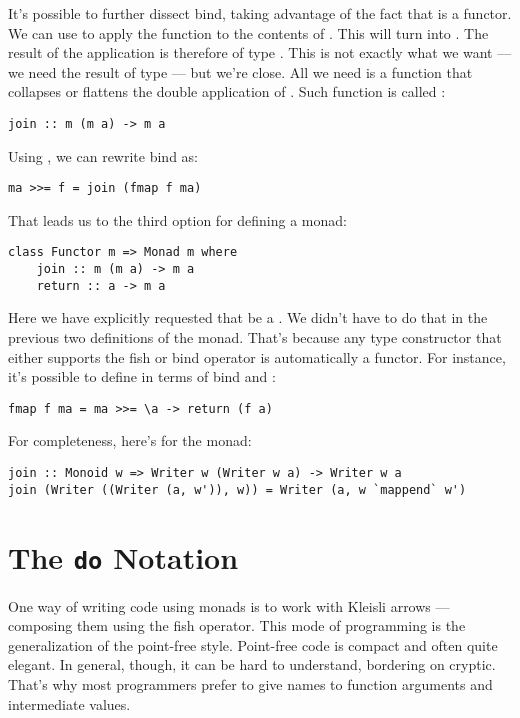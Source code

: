 It's possible to further dissect bind, taking advantage of the fact that
 is a functor. We can use  to apply the function
 to the contents of . This
will turn  into . The result of the application
is therefore of type . This is not exactly what we
want --- we need the result of type  --- but we're close.
All we need is a function that collapses or flattens the double
application of . Such function is called :

\begin{Verbatim}
join :: m (m a) -> m a
\end{Verbatim}
Using , we can rewrite bind as:

\begin{Verbatim}
ma >>= f = join (fmap f ma)
\end{Verbatim}
That leads us to the third option for defining a monad:

\begin{Verbatim}
class Functor m => Monad m where
    join :: m (m a) -> m a
    return :: a -> m a
\end{Verbatim}
Here we have explicitly requested that  be a .
We didn't have to do that in the previous two definitions of the monad.
That's because any type constructor  that either supports the
fish or bind operator is automatically a functor. For instance, it's
possible to define  in terms of bind and :

\begin{Verbatim}
fmap f ma = ma >>= \a -> return (f a)
\end{Verbatim}
For completeness, here's  for the  monad:

\begin{Verbatim}
join :: Monoid w => Writer w (Writer w a) -> Writer w a
join (Writer ((Writer (a, w')), w)) = Writer (a, w `mappend` w')
\end{Verbatim}

\section{The \texttt{do} Notation}

One way of writing code using monads is to work with Kleisli arrows ---
composing them using the fish operator. This mode of programming is the
generalization of the point-free style. Point-free code is compact and
often quite elegant. In general, though, it can be hard to understand,
bordering on cryptic. That's why most programmers prefer to give names
to function arguments and intermediate values.

